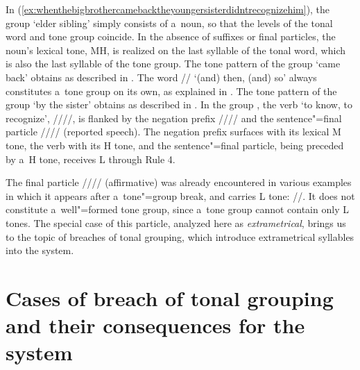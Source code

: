 In (\ref{ex:whenthebigbrothercamebacktheyoungersisterdidntrecognizehim}), the group  ‘elder sibling’ simply consists of a~noun, so that the levels of the tonal word
and tone group coincide. In the absence of suffixes or final particles, the noun's lexical tone, MH, is
realized on the last syllable of the tonal word, which is also the last syllable of the tone
group.
The tone pattern of the group  ‘came back’ obtains as described in .
The word // ‘(and) then, (and) so’ always constitutes a~tone group on its own, as explained in .
The tone pattern of the group  ‘by the sister’ obtains as described in .
In the group , the verb ‘to know, to recognize’,
////, is flanked by the {negation} prefix ////
and the sentence"=final particle //// ({reported speech}). The {negation} prefix surfaces with its lexical M tone, the verb with its H tone, and the
sentence"=final particle, being preceded by a~H tone, receives L through Rule 4.

The final particle //// ({affirmative}) was already encountered in various examples in which it appears after a~tone"=group break, and carries L tone: \mbox{//.} It does not constitute a~well"=formed tone group, since a~tone group cannot contain only L tones. The special case of this particle, analyzed here as \textit{extrametrical}, brings us to the topic of breaches of tonal grouping, which introduce extrametrical syllables into the system.


\section[Cases of breach of tonal grouping and their consequences]{Cases of breach of tonal grouping and their consequences for the system}
\label{sec:casesofbreachoftonalgroupingandconsequencesforthesystem}


